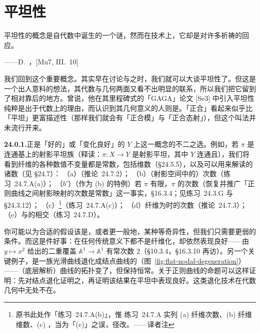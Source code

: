 
\chapter{平坦性}
\label{ch:flatness}

\epigraph{平坦性的概念是自代数中诞生的一个谜，然而在技术上，它却是对许多祈祷的回应。}{——D.~\trMumford，[Mu7, III.~10]}

我们回到\trFlatness{}这个重要概念。其实早在讨论\trQCSheaf{}与\trMorphism{}之时，我们就可以大谈平坦性了。但这是一个出人意料的想法，其代数与几何两面又看不出明显的联系，所以我们把它留到了相对靠后的地方。\trSerre{}曾说，他在其里程碑式的「GAGA」论文 [Se3] 中引入平坦性纯粹是出于代数上的理由，而认识到其几何意义的人则是\trGrothendieck。「正合」看起来似乎比「平坦」更富描述性（那样我们就会有「正合模」与「正合态射」），但这个叫法并未流行开来。

\textbf{24.0.1.}\quad \trFlat{}\trMorphism{}正是「好的」或「变化良好」的 $Y$ 上\trFamily{}这一概念的不二之选。例如，若 $\pi$ 是连通\trNoether{}基上的射影平坦族（释读：$\pi\colon X\to Y$ 是射影平坦\trMorphism，其中 $Y$ 连通且\trNoether），我们将看到纤维的各种数值不变量都是常数，包括维数（\S24.5.5），以及可以用\trEulerCharacteristic{}来解读的诸数（见 \S24.7）：
（a）\trHilbertPolynomial（\mbox{推论~24.7.2}）；
（b）（射影空间中的）次数（\mbox{练习~24.7.A}(a)）；
（\(b'\)）（作为 (b) 的特例）若 $\pi$ 有限，$\pi$ 的次数（恢复并推广「正则曲线之间射影映射的次数是常数」这一事实，\S16.3.4；见\mbox{练习~24.3.G} 与 \S24.3.12）；
（c）\trArithmeticGenus\footnote{原书此处作「\mbox{练习~24.7.A}(b)」，惟 \mbox{练习~24.7.A} 实列 (a) 纤维次数、(b) 纤维维数、(c) \trArithmeticGenus，当为「(c)」之误，径改。——译者注}（\mbox{练习~24.7.A}(c)）；
（d）纤维为\trCurve{}时\trLineBundle{}的次数（\mbox{推论~24.7.3}）；
（e）\trDivisor{}与\trLineBundle{}的相交（\mbox{练习~24.7.D}）。

你可能以为合适的假设该是\trSmoothness，或者更一般地，某种等奇异性，但我们只需要更弱的条件。而这是件好事：\trBranchedCover{}在任何传统意义下都不是纤维化，却依然表现良好——由 $y\mapsto x^2$ 给出的二重覆盖 $\mathbb{A}^1\to\mathbb{A}^1$ 有常次数 $2$（\S10.3.4，\S16.3.10 再访）。另一个关键例子，是一族光滑曲线退化成结点曲线的\trFamily（图~\ref{fig:flat-nodal-degeneration}）——（底层解析）曲线的拓扑变了，但\trArithmeticGenus{}保持恒常。关于正则曲线的命题可以这样证明：先对结点退化证明之，再证明该结果在平坦\trFamily{}中表现良好。这类退化技术在代数几何中无处不在。

